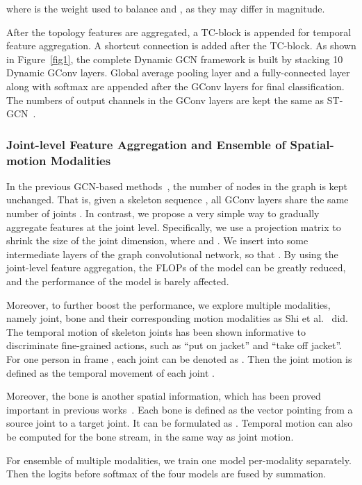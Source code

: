 \documentclass[sigconf]{acmart}
\begin{document}
where  is the weight used to balance  and , as they may differ in magnitude.

After the topology features are aggregated, a TC-block is appended for temporal feature aggregation. A shortcut connection is added after the TC-block. As shown in Figure~\ref{fig1}, the complete Dynamic GCN framework is built by stacking 10 Dynamic GConv layers. Global average pooling layer and a fully-connected layer along with softmax are appended after the GConv layers for final classification. The numbers of output channels in the GConv layers are kept the same as ST-GCN~\cite{yanspatial}.

\subsubsection{Joint-level Feature Aggregation and Ensemble of Spatial-motion Modalities}

In the previous GCN-based methods~\cite{yanspatial,shi2019two,shi2019}, the number of nodes in the graph is kept unchanged. That is, given a skeleton sequence , all GConv layers share the same number of joints . In contrast, we propose a very simple way to gradually aggregate features at the joint level. Specifically, we use a projection matrix  to shrink the size of the joint dimension, where  and . We insert  into some intermediate layers of the graph convolutional network, so that . By using the joint-level feature aggregation, the FLOPs of the model can be greatly reduced, and the performance of the model is barely affected.

Moreover, to further boost the performance, we explore multiple modalities, namely joint, bone and their corresponding motion modalities as Shi et al.~\cite{shi2019,shi2019two} did.
The temporal motion of skeleton joints has been shown informative to discriminate fine-grained actions, such as ``put on jacket'' and ``take off jacket''. For one person in frame , each joint can be denoted as . Then the joint motion  is defined as the temporal movement of each joint .

Moreover, the bone is another spatial information, which has been proved important in previous works~\cite{shi2019two}. Each bone is defined as the vector pointing from a source joint to a target joint. It can be formulated as . Temporal motion can also be computed for the bone stream, in the same way as joint motion.

For ensemble of multiple modalities, we train one model per-modality separately. Then the logits before softmax of the four models are fused by summation.
\end{document}
